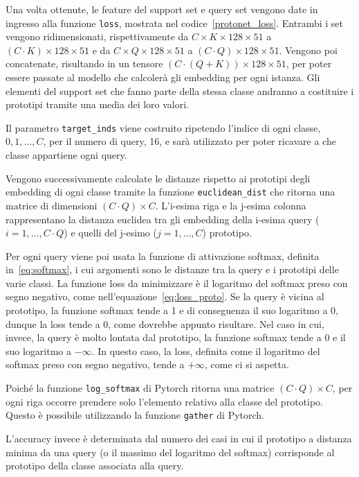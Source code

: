 \documentclass[12pt,a4paper,titlepage]{article}
\begin{document}
Una volta ottenute, le feature del support set e query set vengono date in ingresso alla funzione \texttt{loss}, mostrata nel codice~\ref{protonet_loss}. Entrambi i set vengono ridimensionati, rispettivamente da $C \times K \times 128 \times 51$ a $(C \cdot K) \times 128 \times 51$ e da $C \times Q \times 128 \times 51$ a $(C \cdot Q) \times 128 \times 51$.
Vengono poi concatenate, risultando in un tensore $\left(C \cdot (Q + K)\right) \times 128 \times 51$, per poter essere passate al modello che calcolerà gli embedding per ogni istanza.
Gli elementi del support set che fanno parte della stessa classe andranno a costituire i prototipi tramite una media dei loro valori.

Il parametro \texttt{target\_inds} viene costruito ripetendo l'indice di ogni classe, $0, 1, \dots, C$, per il numero di query, 16, e sarà utilizzato per poter ricavare a che classe appartiene ogni query.

Vengono successivamente calcolate le distanze rispetto ai prototipi degli embedding di ogni classe tramite la funzione \texttt{euclidean\_dist} che ritorna una matrice di dimensioni $(C \cdot Q) \times C$. L'i-esima riga e la j-esima colonna rappresentano la distanza euclidea tra gli embedding della i-esima query ($i = 1, \dots, C \cdot Q$) e quelli del j-esimo ($j = 1, \dots, C$) prototipo.

Per ogni query viene poi usata la funzione di attivazione softmax, definita in~\eqref{eq:softmax}, i cui argomenti sono le distanze tra la query e i prototipi delle varie classi. La funzione loss da minimizzare è il logaritmo del softmax preso con segno negativo, come nell'equazione~\eqref{eq:loss_proto}. Se la query è vicina al prototipo, la funzione softmax tende a 1 e di conseguenza il suo logaritmo a 0, dunque la loss tende a 0, come dovrebbe appunto risultare. Nel caso in cui, invece, la query è molto lontata dal prototipo, la funzione softmax tende a 0 e il suo logaritmo a $-\infty$. In questo caso, la loss, definita come il logaritmo del softmax preso con segno negativo, tende a $+\infty$, come ci si aspetta.

Poiché la funzione \texttt{log\_softmax} di Pytorch ritorna una matrice $(C \cdot Q) \times C$, per ogni riga occorre prendere solo l'elemento relativo alla classe del prototipo. Questo è possibile utilizzando la funzione \texttt{gather} di Pytorch.

L'accuracy invece è determinata dal numero dei casi in cui il prototipo a distanza minima da una query (o il massimo del logaritmo del softmax) corrisponde al prototipo della classe associata alla query.
\end{document}

